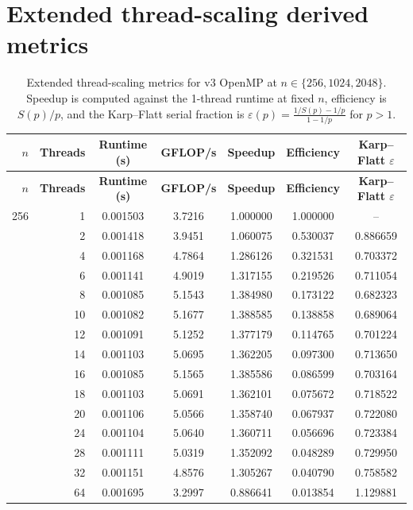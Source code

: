 \section{Extended thread-scaling derived metrics}

\begin{longtable}{rrccccc}
\caption{Extended thread-scaling metrics for v3 OpenMP at $n \in \{256, 1024, 2048\}$. Speedup is computed against the 1-thread runtime at fixed $n$, efficiency is $S(p)/p$, and the Karp--Flatt serial fraction is $\varepsilon(p)=\frac{1/S(p)-1/p}{1-1/p}$ for $p>1$.}\\
\toprule
\textbf{$n$} & \textbf{Threads} & \textbf{Runtime (s)} & \textbf{GFLOP/s} & \textbf{Speedup} & \textbf{Efficiency} & \textbf{Karp--Flatt $\varepsilon$} \\
\midrule
\endfirsthead
\toprule
\textbf{$n$} & \textbf{Threads} & \textbf{Runtime (s)} & \textbf{GFLOP/s} & \textbf{Speedup} & \textbf{Efficiency} & \textbf{Karp--Flatt $\varepsilon$} \\
\midrule
\endhead
256 & 1 & 0.001503 & 3.7216 & 1.000000 & 1.000000 & -- \\
 & 2 & 0.001418 & 3.9451 & 1.060075 & 0.530037 & 0.886659 \\
 & 4 & 0.001168 & 4.7864 & 1.286126 & 0.321531 & 0.703372 \\
 & 6 & 0.001141 & 4.9019 & 1.317155 & 0.219526 & 0.711054 \\
 & 8 & 0.001085 & 5.1543 & 1.384980 & 0.173122 & 0.682323 \\
 & 10 & 0.001082 & 5.1677 & 1.388585 & 0.138858 & 0.689064 \\
 & 12 & 0.001091 & 5.1252 & 1.377179 & 0.114765 & 0.701224 \\
 & 14 & 0.001103 & 5.0695 & 1.362205 & 0.097300 & 0.713650 \\
 & 16 & 0.001085 & 5.1565 & 1.385586 & 0.086599 & 0.703164 \\
 & 18 & 0.001103 & 5.0691 & 1.362101 & 0.075672 & 0.718522 \\
 & 20 & 0.001106 & 5.0566 & 1.358740 & 0.067937 & 0.722080 \\
 & 24 & 0.001104 & 5.0640 & 1.360711 & 0.056696 & 0.723384 \\
 & 28 & 0.001111 & 5.0319 & 1.352092 & 0.048289 & 0.729950 \\
 & 32 & 0.001151 & 4.8576 & 1.305267 & 0.040790 & 0.758582 \\
 & 64 & 0.001695 & 3.2997 & 0.886641 & 0.013854 & 1.129881 \\

\end{longtable}

